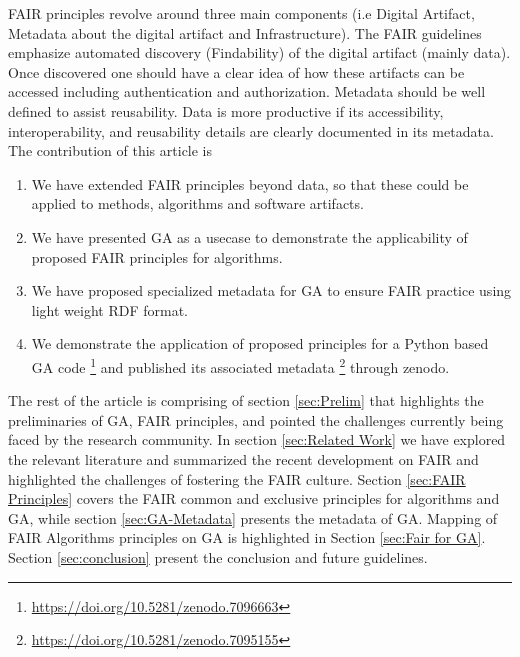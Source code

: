 \documentclass[preprint,12pt]{elsarticle}
\begin{document}
FAIR principles revolve around three main components (i.e Digital Artifact, Metadata about the digital artifact and Infrastructure). The FAIR guidelines emphasize automated discovery (Findability) of the digital artifact (mainly data). Once discovered one should have a clear idea of how these artifacts can be accessed including authentication and authorization. Metadata should be well defined to assist reusability. Data is more productive if its accessibility, interoperability, and reusability details are clearly documented in its metadata.\\  
The contribution of this article is\\
\begin{enumerate}[noitemsep]
\item We have extended FAIR principles beyond data, so that these could be applied to methods, algorithms and software artifacts. 
\item We have presented GA as a usecase to demonstrate the applicability of proposed FAIR principles for algorithms.
\item We have proposed specialized metadata for GA to ensure FAIR practice using light weight RDF format.
\item We demonstrate the application of proposed principles for a Python based GA code \footnote{\label{PC}\url{https://doi.org/10.5281/zenodo.7096663}} and published its associated metadata \footnote{\label{mt}\url{https://doi.org/10.5281/zenodo.7095155}} through zenodo.

\end{enumerate}

The rest of the article is comprising of section \ref{sec:Prelim} that highlights the preliminaries of GA, FAIR principles, and pointed the challenges currently being faced by the research community. In section \ref{sec:Related Work} we have explored the relevant literature and summarized the recent development on FAIR and highlighted the challenges of fostering the FAIR culture. Section \ref{sec:FAIR Principles} covers the FAIR common and exclusive principles for algorithms and GA, while section \ref{sec:GA-Metadata} presents the metadata of GA. Mapping of FAIR Algorithms principles on GA is highlighted in Section \ref{sec:Fair for GA}. Section \ref{sec:conclusion} present the conclusion and future guidelines. 	
\end{document}
